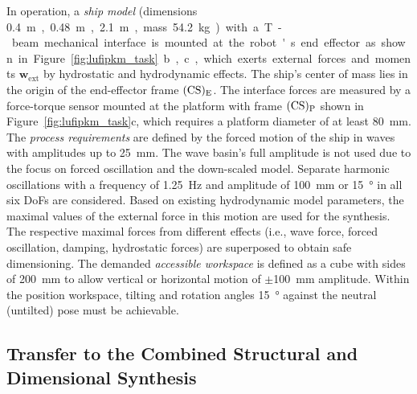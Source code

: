 In operation, a \emph{ship model} (dimensions \SI{0.4} m, \SI{0.48} m, \SI{2.1} m, mass \SI{54.2} kg) with a T-beam mechanical interface is mounted at the robot's end effector as shown in Figure~\ref{fig:lufipkm_task}b,c, which exerts external forces and moments $\bm{w}_\mathrm{ext}$ by hydrostatic and hydrodynamic effects. 
The ship's center of mass lies in the origin of the end-effector frame $(\mathrm{CS})_{\mathrm{E}}$.
The interface forces are measured by a force-torque sensor mounted at the platform with frame $(\mathrm{CS})_{\mathrm{P}}$ shown in Figure~\ref{fig:lufipkm_task}c, which requires a platform diameter of at least \SI{80}{\milli\metre}.
%
The \emph{process requirements} are defined by the forced motion of the ship in waves with amplitudes up to \SI{25}{\milli\metre}.
The wave basin's full amplitude is not used due to the focus on forced oscillation and the down-scaled model.
Separate harmonic oscillations with a frequency of \SI{1.25}{\hertz} and amplitude of \SI{100}{\milli\metre} or \SI{15}{\degree} in all six DoFs are considered.
Based on existing hydrodynamic model parameters, the maximal values of the external force in this motion are used for the synthesis.
The respective maximal forces from different effects (i.e., wave force, forced oscillation, damping, hydrostatic forces) are superposed to obtain safe dimensioning.
The demanded \emph{accessible workspace} is defined as a cube with sides of \SI{200}{\milli\metre} to allow vertical or horizontal motion of $\pm{}$\SI{100}{\milli\metre} amplitude.
Within the position workspace, tilting and rotation angles \SI{15}{\degree} against the neutral (untilted) pose must be achievable.


%

%

%


\subsection{Transfer to the Combined Structural and Dimensional Synthesis}
\label{sec:eval_lufi_synthesis}

